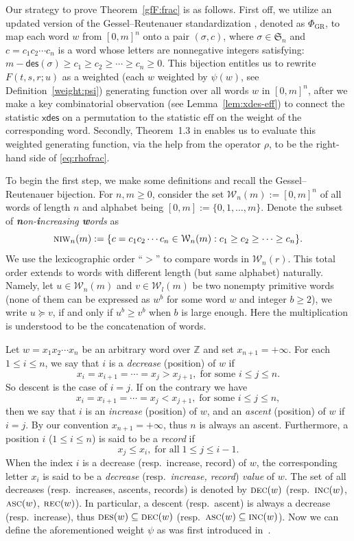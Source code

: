 \documentclass[12pt]{amsart} %
\numberwithin{equation}{section}
\theoremstyle{plain}
\theoremstyle{definition}
\newcommand{\Z}{\mathbb{Z}}
\def\xdes{\mathsf{xdes}}
\def\DES{\hbox{\rm\textsc{des}}}
\def\DEC{\hbox{\rm\textsc{dec}}}
\def\INC{\hbox{\rm\textsc{inc}}}
\def\REC{\hbox{\rm\textsc{rec}}}
\def\NIW{\hbox{\rm\textsc{niw}}}
\def\des{\mathsf{des}}
\def\S{\mathfrak{S}}
\def\W{\mathcal{W}}
\def\eff{\mathrm{eff}}
\def\ASC{\hbox{\rm\textsc{asc}}}
\begin{document}
Our strategy to prove Theorem~\ref{gfF:frac} is as follows. First off, we utilize an updated version of the Gessel--Reutenauer standardization \cite{ge, fh, fh3}, denoted as $\Phi_{\mathrm{GR}}$, to map each word $w$ from $[0,m]^n$ onto a pair $(\sigma,c)$, where $\sigma\in\S_n$ and $c=c_1c_2\cdots c_n$ is a word whose letters are nonnegative integers satisfying: $m-\des(\sigma)\ge c_1\ge c_2\ge\cdots\ge c_n\ge 0$. This bijection entitles us to rewrite $F(t,s,r ;u)$ as a weighted (each $w$ weighted by $\psi(w)$, see Definition~\ref{weight:psi}) generating function over all words $w$ in $[0,m]^n$, after we make a key combinatorial observation (see Lemma~\ref{lem:xdes-eff}) to connect the statistic $\xdes$ on a permutation to the statistic $\eff$ on the weight of the corresponding word. Secondly, Theorem~1.3 in \cite{fh} enables us to evaluate this weighted generating function, via the help from the operator $\rho$, to be the right-hand side of \eqref{eq:rhofrac}. 

To begin the first step, we make some definitions and recall the Gessel--Reutenauer bijection. For $n,m\ge 0$, consider the set $\W_n(m):=[0,m]^n$ of all words of length $n$ and alphabet being $[0,m]:=\{0,1,\ldots,m\}$. Denote the subset of {\em {\bf\em n}on-{\bf\em i}ncreasing {\bf\em w}ords} as
$$\NIW_n(m):=\{c=c_1c_2\cdots c_n\in\W_n(m): c_1\ge c_2\ge\cdots\ge c_n\}.$$
We use the lexicographic order ``$>$'' to compare words in $\W_n(r)$. This total order extends to words with different length (but same alphabet) naturally. Namely, let $u\in\W_n(m)$ and $v\in\W_l(m)$ be two nonempty primitive words (none of them can be expressed as $w^b$ for some word $w$ and integer $b\ge 2$), we write $u\succeq v$, if and only if $u^b\ge v^b$ when $b$ is large enough. Here the multiplication is understood to be the concatenation of words.

Let $w=x_1x_2\cdots x_n$ be an arbitrary word over $\Z$ and set $x_{n+1}=+\infty$. For each $1\le i\le n$, we say that $i$ is a {\em decrease} (position) of $w$ if $$x_i= x_{i+1}=\cdots= x_j> x_{j+1},\; \text{for some $i\le j\le n$}.$$ So descent is the case of $i=j$. If on the contrary we have $$x_i= x_{i+1}=\cdots= x_j< x_{j+1},\; \text{for some $i\le j\le n$},$$ then we say that $i$ is an {\em increase} (position) of $w$, and an {\em ascent} (position) of $w$ if $i=j$. By our convention $x_{n+1}=+\infty$, thus $n$ is always an ascent. Furthermore, a position $i$ ($1\le i\le n$) is said to be a {\em record} if $$x_j\le x_i,\;\text{for all}\; 1\le j\le i-1.$$ When the index $i$ is a decrease (resp.~increase, record) of $w$, the corresponding letter $x_i$ is said to be a {\em decrease} (resp.~{\em increase, record}) {\em value} of $w$. The set of all decreases (resp.~increases, ascents, records) is denoted by $\DEC(w)$ (resp.~$\INC(w)$, $\ASC(w)$, $\REC(w)$). In particular, a descent (resp.~ascent) is always a decrease (resp.~increase), thus $\DES(w)\subseteq \DEC(w)$ (resp.~$\ASC(w)\subseteq \INC(w)$). Now we can define the aforementioned weight $\psi$ as was first introduced in~\cite{fh}.
\end{document}
